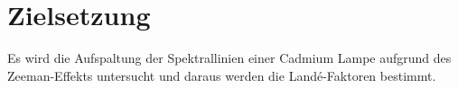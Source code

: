 \section{Zielsetzung}
\label{sec:Zielsetzung}

Es wird die Aufspaltung der Spektrallinien einer Cadmium Lampe aufgrund des Zeeman-Effekts untersucht 
und daraus werden die Landé-Faktoren bestimmt.